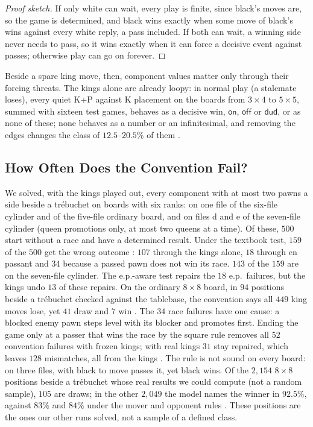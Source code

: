 \begin{proof}[Proof sketch]
If only white can wait, every play is finite, since black's moves are, so the game is determined, and black
wins exactly when some move of black's wins against every white reply, a pass included. If both can wait, a
winning side never needs to pass, so it wins exactly when it can force a decisive event against passes;
otherwise play can go on forever.
\end{proof}

Beside a spare king move, then, component values matter only through their forcing threats. The kings
alone are already loopy: in normal play (a stalemate loses), every quiet K+P against K placement on the boards
from $3\times4$ to $5\times5$, summed with sixteen test games, behaves as a decisive win, $\textsf{on}$,
$\textsf{off}$ or $\textsf{dud}$, or as none of these; none behaves as a number or an infinitesimal, and removing
the edges changes the class of $12.5$--$20.5\%$ of them .

\subsection{How Often Does the Convention Fail?}\label{sec:kings-sweep}

We solved, with the kings played out, every component with at most two pawns a side beside a
tr\'ebuchet on boards with six ranks: on one file of the six-file cylinder and of the five-file ordinary board,
and on files d and e of the seven-file cylinder (queen promotions only, at most two queens at a time). Of these, $500$ start without a race and have a determined result. Under the textbook test, $159$ of the $500$ get the wrong outcome : $107$ through
the kings alone, $18$ through en passant and $34$ because a passed pawn does not win its race. $143$ of the
$159$ are on the seven-file cylinder. The e.p.-aware test repairs the $18$ e.p.\ failures, but the kings undo $13$ of these repairs. On the ordinary $8\times8$ board, in $94$ positions beside a tr\'ebuchet checked against the tablebase, the
convention says all $449$ king moves lose, yet $41$ draw and $7$ win . The $34$ race failures have one cause: a blocked
enemy pawn steps level with its blocker and promotes first. Ending the game only at a passer that wins the
race by the square rule removes all $52$ convention failures with frozen kings; with real kings $31$ stay repaired, which leaves $128$ mismatches, all from the
kings . The rule is not sound on every board: on three files,  with black to move passes it, yet black wins. Of the $2{,}154$ $8\times8$ positions beside a tr\'ebuchet whose real results we could compute (not a random sample), $105$ are
draws; in the other $2{,}049$ the model names the winner in $92.5\%$, against $83\%$ and $84\%$ under the mover
and opponent rules . These positions are the ones our other runs solved, not a sample of a defined class.
